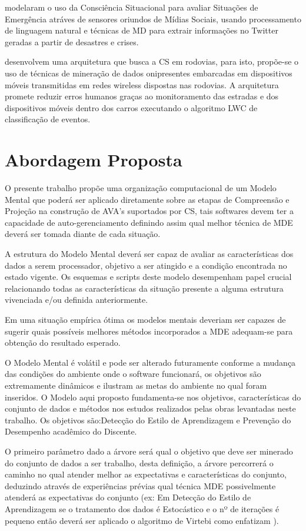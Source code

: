 \documentclass[12pt]{article}
\begin{document}
\cite{Yin_et_al_2012} modelaram o uso da Consciência Situacional para avaliar Situações de Emergência atráves de sensores oriundos de Mídias Sociais, usando processamento de linguagem natural e técnicas de MD para extrair informações no Twitter geradas a partir de desastres e crises.

\cite{Krishnaswamy_et_al_2005} desenvolvem uma arquitetura que busca a CS em rodovias, para isto, propõe-se o uso de técnicas de mineração de dados onipresentes embarcadas em dispositivos móveis transmitidas em redes wireless dispostas nas rodovias. A arquitetura promete reduzir erros humanos graças ao monitoramento das estradas e dos dispositivos móveis dentro dos carros executando o algoritmo LWC de classificação de eventos.

\section{Abordagem Proposta}

O presente trabalho propõe uma organização computacional de um Modelo Mental que poderá ser aplicado diretamente sobre as etapas de Compreensão e Projeção na construção de AVA's suportados por CS, tais softwares devem ter a capacidade de auto-gerenciamento definindo assim qual melhor técnica de MDE deverá ser tomada diante de cada situação.

A estrutura do Modelo Mental deverá ser capaz de avaliar as características dos dados a serem processador, objetivo a ser atingido e a condição encontrada no estado vigente. Os esquemas e scripts deste modelo desempenham papel crucial relacionando todas as características da situação presente a alguma estrutura vivenciada e/ou definida anteriormente.

Em uma situação empírica ótima os modelos mentais deveriam ser capazes de sugerir quais possíveis melhores métodos incorporados a MDE adequam-se para obtenção do resultado esperado. 

O Modelo Mental é volátil e pode ser alterado futuramente conforme a mudança das condições do ambiente onde o software funcionará, os objetivos são extremamente dinâmicos e ilustram as metas do ambiente no qual foram inseridos. O Modelo aqui proposto fundamenta-se nos objetivos, características do conjunto de dados e métodos nos estudos realizados pelas obras levantadas neste trabalho. Os objetivos são:Detecção do Estilo de Aprendizagem e Prevenção do Desempenho acadêmico do Discente.

O primeiro parâmetro dado a árvore será qual o objetivo que deve ser minerado do conjunto de dados a ser trabalho, desta definição, a árvore percorrerá o caminho no qual atender melhor as expectativas e características do conjunto, deduzindo através de experiências prévias qual técnica MDE possivelmente atenderá as expectativas do conjunto (ex: Em Detecção do Estilo de Aprendizagem se o tratamento dos dados é Estocástico e o nº de iterações é pequeno então deverá ser aplicado o algoritmo de Virtebi como enfatizam \cite{Sena_etal_2016} ). 
\end{document}
